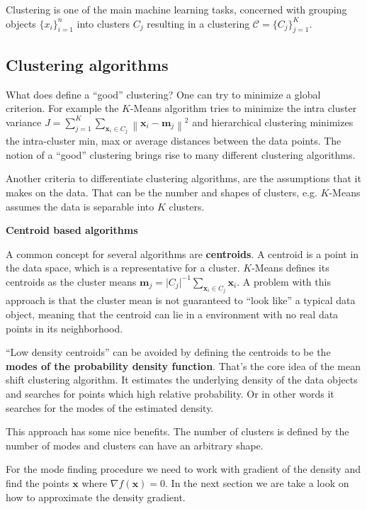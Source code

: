 \documentclass{article}
\newcommand{\norm}[1]{\left\lVert#1\right\rVert}
\begin{document}
Clustering is one of the main machine learning tasks, concerned with grouping objects $\{x_i\}_{i=1}^n$ into clusters $C_j$ resulting in a clustering $\mathcal{C} = \{ C_j \}_{j=1}^K$.

\subsection{Clustering algorithms} \label{sec:clustering-algorithms}

What does define a ``good'' clustering? One can try to minimize a global criterion. For example the $K$-Means algorithm tries to minimize the intra cluster variance $J = \sum_{j=1}^K \sum_{\bm{x}_i \in C_j} \norm{\bm{x}_i - \bm{m}_j}^2$ and hierarchical clustering minimizes the intra-cluster min, max or average distances between the data points. The notion of a ``good'' clustering brings rise to many different clustering algorithms.

Another criteria to differentiate clustering algorithms, are the assumptions that it makes on the data. That can be the number and shapes of clusters, e.g. $K$-Means assumes the data is separable into $K$ clusters. 

\textbf{Centroid based algorithms}

A common concept for several algorithms are \textbf{centroids}. A centroid is a point in the data space, which is a representative for a cluster. $K$-Means defines its centroids as the cluster means $\bm{m}_j = \lvert C_j \rvert^{-1} \sum_{\bm{x}_i \in C_j} \bm{x}_i$. A problem with this approach is that the cluster mean is not guaranteed to ``look like'' a typical data object, meaning that the centroid can lie in a environment with no real data points in its neighborhood.

``Low density centroids'' can be avoided by defining the centroids to be the \textbf{modes of the probability density function}. That's the core idea of the mean shift clustering algorithm. It estimates the underlying density of the data objects and searches for points which high relative probability. Or in other words it searches for the modes of the estimated density.

This approach has some nice benefits. The number of clusters is defined by the number of modes and clusters can have an arbitrary shape.

For the mode finding procedure we need to work with gradient of the density and find the points $\bm{x}$ where $\nabla f(\bm{x}) = 0$. In the next section we are take a look on how to approximate the density gradient. 
\end{document}
